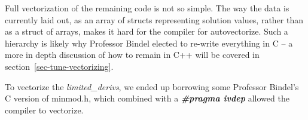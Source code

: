 Full vectorization of the remaining code is not so simple.  The way the data is 
currently laid out, as an array of structs representing solution values, rather
than as a struct of arrays, makes it hard for the compiler for autovectorize.
Such a hierarchy is likely why Professor Bindel elected to re-write everything
in C -- a more in depth discussion of how to remain in C++ will be covered in
section~\ref{sec-tune-vectorizing}.

To vectorize the \emph{limited\_derivs}, we ended up borrowing some Professor
Bindel's C version of minmod.h, which combined with a \textbf{\emph{\#pragma ivdep}}
allowed the compiler to vectorize.


